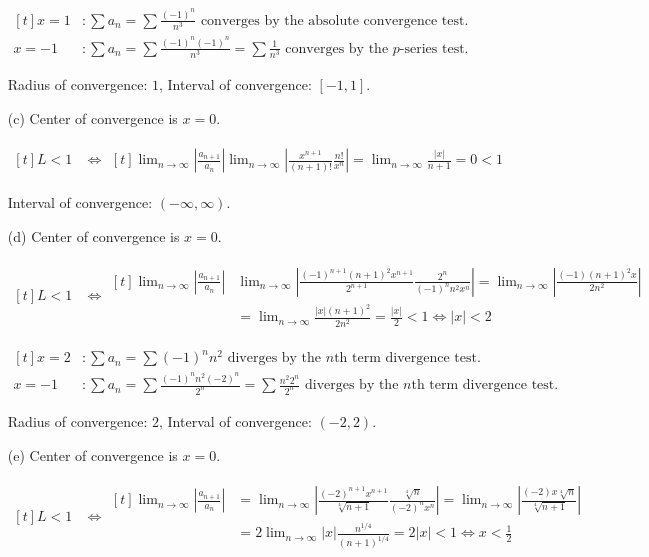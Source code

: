 \documentclass[preview, margin=0.6in]{standalone}
\begin{document}
\begin{itemize}
	$\begin{aligned}[t]
		x=1 &: \sum a_n=\sum \frac{(-1)^n}{n^3}\text{ converges by the absolute convergence test.} \\
		x=-1&: \sum a_n=\sum \frac{(-1)^n(-1)^n}{n^3}=\sum \frac{1}{n^3} \text{ converges by the $p$-series test.}
	\end{aligned}$

	Radius of convergence: $1$, Interval of convergence: $\boxed{[-1,1]}$.

\item[(c)]
	Center of convergence is $x=0$.

	$\begin{aligned}[t]
		L<1
		&\iff 
		\begin{aligned}[t]
			\lim_{n\to\infty}\left|\frac{a_{n+1}}{a_n}\right|
			\lim_{n\to\infty}\left|\frac{x^{n+1}}{(n+1)!}\frac{n!}{x^n}\right|
			=\lim_{n\to\infty}\frac{|x|}{n+1}
			=0<1
		\end{aligned}
	\end{aligned}$

	Interval of convergence: $\boxed{(-\infty,\infty)}$.

\item[(d)]
	Center of convergence is $x=0$.

	$\begin{aligned}[t]
		L<1
		&\iff 
		\begin{aligned}[t]
			\lim_{n\to\infty}\left|\frac{a_{n+1}}{a_n}\right|
			&\lim_{n\to\infty}\left|\frac{(-1)^{n+1}(n+1)^2x^{n+1}}{2^{n+1}}\frac{2^n}{(-1)^nn^2x^n}\right|
			=\lim_{n\to\infty}\left|\frac{(-1)(n+1)^2x}{2n^2}\right| \\
			&=\lim_{n\to\infty}\frac{|x|(n+1)^2}{2n^2}
			=\frac{|x|}{2}<1
			\iff |x|<2
		\end{aligned}
	\end{aligned}$

	$\begin{aligned}[t]
		x=2 &: \sum a_n=\sum (-1)^n n^2 \text{ diverges by the $n$th term divergence test.} \\
		x=-1&: \sum a_n=\sum \frac{(-1)^n n^2 (-2)^n}{2^n}=\sum \frac{n^2 2^n}{2^n} \text{ diverges by the $n$th term divergence test.}
	\end{aligned}$

	Radius of convergence: $2$, Interval of convergence: $\boxed{(-2,2)}$.

\item[(e)]
	Center of convergence is $x=0$.

	$\begin{aligned}[t]
		L<1
		&\iff 
		\begin{aligned}[t]
			\lim_{n\to\infty}\left|\frac{a_{n+1}}{a_n}\right|
			&=\lim_{n\to\infty}\left|\frac{(-2)^{n+1}x^{n+1}}{\sqrt[4]{n+1}}\frac{\sqrt[4]{n}}{(-2)^nx^n}\right|
			=\lim_{n\to\infty}\left|\frac{(-2)x \sqrt[4]{n}}{\sqrt[4]{n+1}}\right| \\
			&=2 \lim_{n\to\infty}|x| \frac{n^{1/4}}{(n+1)^{1/4}}
			=2|x|<1
			\iff x<\frac12
		\end{aligned}
	\end{aligned}$


\end{itemize}
\end{document}
